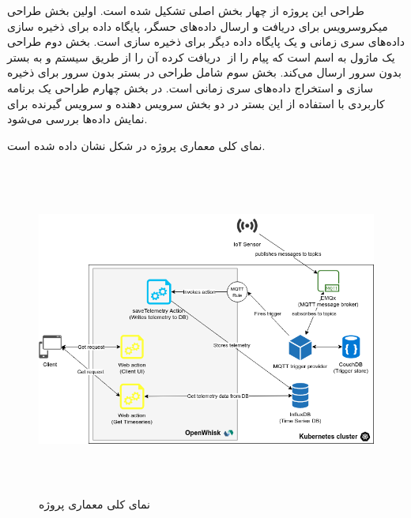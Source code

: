 طراحی این پروژه از چهار بخش اصلی تشکیل شده است. اولین بخش طراحی میکروسرویس   برای دریافت و ارسال داده‌های حسگر، پایگاه داده برای ذخیره سازی داده‌های سری زمانی و یک پایگاه داده دیگر برای ذخیره سازی  است. بخش دوم طراحی یک ماژول  به اسم  است که پیام را از ‌ دریافت کرده آن را از طریق سیستم  و  به بستر بدون سرور ارسال می‌کند. بخش سوم شامل طراحی  در بستر بدون سرور  برای ذخیره سازی و استخراج داده‌های سری زمانی است. در بخش چهارم طراحی یک برنامه کاربردی با استفاده از این بستر در دو بخش سرویس دهنده و سرویس گیرنده برای نمایش داده‌ها بررسی می‌شود.

نمای کلی معماری پروژه در شکل نشان داده شده است.

\begin{figure}[!h]
	\centering
	\includegraphics[height=11cm]{images/platform-architecture-1}
	\caption{نمای کلی معماری پروژه}
	\label{تصویر 2-1}
\end{figure}

\subsection{}



\subsection{}

